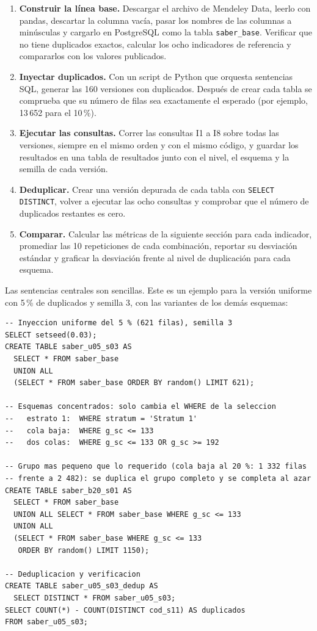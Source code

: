 \documentclass[11pt,openany,oneside,letterpaper]{book}
\begin{document}
\begin{enumerate}
 \item \textbf{Construir la línea base.} Descargar el archivo de Mendeley Data, leerlo con pandas, descartar la columna vacía, pasar los nombres de las columnas a minúsculas y cargarlo en PostgreSQL como la tabla \texttt{saber\_base}. Verificar que no tiene duplicados exactos, calcular los ocho indicadores de referencia y compararlos con los valores publicados.
 \item \textbf{Inyectar duplicados.} Con un script de Python que orquesta sentencias SQL, generar las 160 versiones con duplicados. Después de crear cada tabla se comprueba que su número de filas sea exactamente el esperado (por ejemplo, 13\,652 para el 10\,\%).
 \item \textbf{Ejecutar las consultas.} Correr las consultas I1 a I8 sobre todas las versiones, siempre en el mismo orden y con el mismo código, y guardar los resultados en una tabla de resultados junto con el nivel, el esquema y la semilla de cada versión.
 \item \textbf{Deduplicar.} Crear una versión depurada de cada tabla con \texttt{SELECT DISTINCT}, volver a ejecutar las ocho consultas y comprobar que el número de duplicados restantes es cero.
 \item \textbf{Comparar.} Calcular las métricas de la siguiente sección para cada indicador, promediar las 10 repeticiones de cada combinación, reportar su desviación estándar y graficar la desviación frente al nivel de duplicación para cada esquema.
\end{enumerate}

Las sentencias centrales son sencillas. Este es un ejemplo para la versión uniforme con 5\,\% de duplicados y semilla 3, con las variantes de los demás esquemas:

\begin{small}
\begin{verbatim}
-- Inyeccion uniforme del 5 % (621 filas), semilla 3
SELECT setseed(0.03);
CREATE TABLE saber_u05_s03 AS
  SELECT * FROM saber_base
  UNION ALL
  (SELECT * FROM saber_base ORDER BY random() LIMIT 621);

-- Esquemas concentrados: solo cambia el WHERE de la seleccion
--   estrato 1:  WHERE stratum = 'Stratum 1'
--   cola baja:  WHERE g_sc <= 133
--   dos colas:  WHERE g_sc <= 133 OR g_sc >= 192

-- Grupo mas pequeno que lo requerido (cola baja al 20 %: 1 332 filas
-- frente a 2 482): se duplica el grupo completo y se completa al azar
CREATE TABLE saber_b20_s01 AS
  SELECT * FROM saber_base
  UNION ALL SELECT * FROM saber_base WHERE g_sc <= 133
  UNION ALL
  (SELECT * FROM saber_base WHERE g_sc <= 133
   ORDER BY random() LIMIT 1150);

-- Deduplicacion y verificacion
CREATE TABLE saber_u05_s03_dedup AS
  SELECT DISTINCT * FROM saber_u05_s03;
SELECT COUNT(*) - COUNT(DISTINCT cod_s11) AS duplicados
FROM saber_u05_s03;
\end{verbatim}
\end{small}
\end{document}
